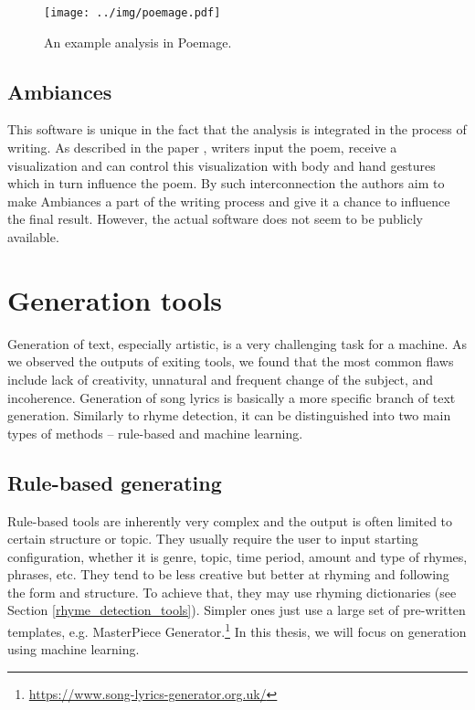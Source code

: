 \begin{figure}[h]\centering
	\texttt{[image: ../img/poemage.pdf]}
	\caption{An example analysis in Poemage.}\label{screenshotPoemage}
\end{figure}

\subsection*{Ambiances}
This software is unique in the fact that the analysis is integrated in the process of writing. As described in the paper \cite{Meneses2015}, writers input the poem, receive a visualization and can control this visualization with body and hand gestures which in turn influence the poem. By such interconnection the authors aim to make Ambiances a part of the writing process and give it a chance to influence the final result. However, the actual software does not seem to be publicly available.


\section{Generation tools}\label{generation_tools}

Generation of text, especially artistic, is a very challenging task for a machine. As we observed the outputs of exiting tools, we found that the most common flaws include lack of creativity, unnatural and frequent change of the subject, and incoherence. Generation of song lyrics is basically a more specific branch of text generation. Similarly to rhyme detection, it can be distinguished into two main types of methods -- rule-based and machine learning.


\subsection{Rule-based generating}
Rule-based tools are inherently very complex and the output is often limited to certain structure or topic. They usually require the user to input starting configuration, whether it is genre, topic, time period, amount and type of rhymes, phrases, etc. They tend to be less creative but better at rhyming and following the form and structure. To achieve that, they may use rhyming dictionaries (see Section \ref{rhyme_detection_tools}). Simpler ones just use a large set of pre-written templates, e.g. MasterPiece Generator.\footnote{\url{https://www.song-lyrics-generator.org.uk/}} In this thesis, we will focus on generation using machine learning.


